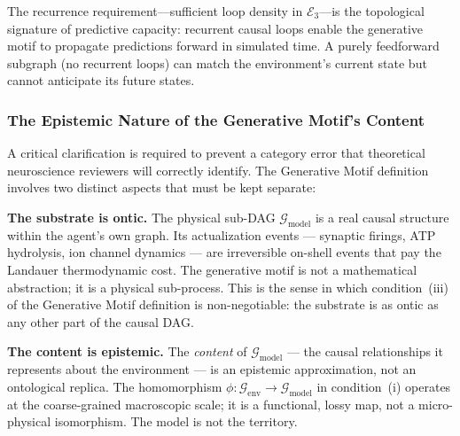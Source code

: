 \documentclass[11pt,a4paper]{article}
\theoremstyle{remark}
\newcommand{\GG}{\mathcal{G}}
\newcommand{\EE}{\mathcal{E}}
\begin{document}
The recurrence requirement---sufficient loop density in $\EE_3$---is the topological
signature of predictive capacity: recurrent causal loops enable the generative
motif to propagate predictions forward in simulated time. A purely feedforward
subgraph (no recurrent loops) can match the environment's current state but cannot
anticipate its future states.

\subsubsection{The Epistemic Nature of the Generative Motif's Content}
\label{subsec:epistemic}

A critical clarification is required to prevent a category error that theoretical
neuroscience reviewers will correctly identify. The Generative Motif definition
involves two distinct aspects that must be kept separate:

\textbf{The substrate is ontic.} The physical sub-DAG $\GG_{\mathrm{model}}$ is
a real causal structure within the agent's own graph. Its actualization events
--- synaptic firings, ATP hydrolysis, ion channel dynamics --- are irreversible
on-shell events that pay the Landauer thermodynamic cost. The generative motif
is not a mathematical abstraction; it is a physical sub-process. This is the
sense in which condition~(iii) of the Generative Motif definition is non-negotiable:
the substrate is as ontic as any other part of the causal DAG.

\textbf{The content is epistemic.} The \emph{content} of $\GG_{\mathrm{model}}$
--- the causal relationships it represents about the environment --- is an
epistemic approximation, not an ontological replica. The homomorphism
$\phi: \GG_{\mathrm{env}} \to \GG_{\mathrm{model}}$ in condition~(i) operates
at the coarse-grained macroscopic scale; it is a functional, lossy map, not a
micro-physical isomorphism. The model is not the territory.
\end{document}
